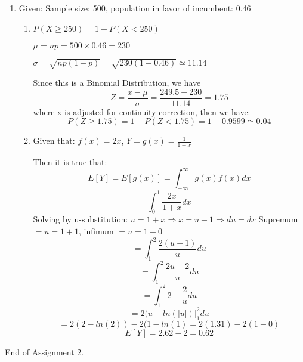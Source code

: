 \documentclass[12pt]{article}
\begin{document}
\begin{enumerate}
		\item Given: Sample size: 500, population in favor of incumbent: 0.46
			\begin{enumerate}
				\item $P(X \geq 250) = 1 - P(X < 250)$
				
				$\mu = np = 500 \times 0.46 = 230$
				
				$\sigma = \sqrt{np(1-p)} = \sqrt{230(1-0.46)} \simeq 11.14$

				Since this is a Binomial Distribution, we have
				$$Z = \frac{x - \mu}{\sigma} = \frac{249.5 - 230}{11.14} = 1.75$$
				where x is adjusted for continuity correction, then we have:
				$$P(Z \geq 1.75) = 1 - P(Z < 1.75) = 1 - 0.9599 \simeq 0.04$$
				
			\item Given that: $f(x) = 2x$, $Y = g(x) = \frac{1}{1 + x}$
			
			Then it is true that:
			$$E[Y] = E[g(x)] = \int_{-\infty}^{\infty} g(x)f(x)dx$$
			$$\int_{0}^{1} \frac{2x}{1 + x}dx$$
			Solving by u-substitution: $u = 1 + x \Rightarrow x = u - 1 \Rightarrow du = dx$
			Supremum $= u = 1 + 1$, infimum $= u = 1 + 0$
			$$= \int_{1}^{2} \frac{2(u-1)}{u}du$$
			$$= \int_{1}^{2} \frac{2u-2}{u}du$$
			$$= \int_{1}^{2} 2 - \frac{2}{u}du$$
			$$= 2(u - ln(|u|)\vert_{1}^{2}du$$
			$$= 2(2 - ln(2)) - 2(1 - ln(1) = 2(1.31) - 2(1 - 0)$$
			$$E[Y] = 2.62 - 2 = 0.62$$
			\end{enumerate}
\end{enumerate}

End of Assignment 2.
\end{document}
